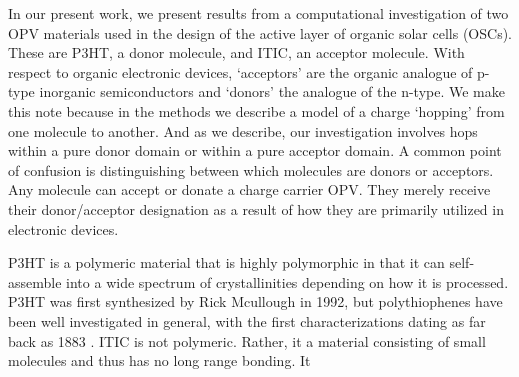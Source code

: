 In our present work, we present results from a computational investigation of two OPV materials
used in the design of the active layer of organic solar cells (OSCs). These are P3HT, a
donor molecule, and ITIC, an acceptor molecule. With respect to organic electronic devices, `acceptors' are the
organic analogue of p-type inorganic semiconductors and `donors' the analogue
of the n-type. We make this note because in the methods we describe a model of
a charge `hopping' from one molecule to another. And as we describe, our
investigation involves hops within a pure donor domain or within a pure
acceptor domain. A common point of confusion is distinguishing between which
molecules are donors or acceptors.
Any molecule can accept or donate a charge carrier OPV.
They merely receive their donor/acceptor designation as a result of how they
are primarily utilized in electronic devices. 

P3HT is a polymeric material that is highly polymorphic in that it can self-assemble into a wide spectrum of
crystallinities depending on how it is processed. 
P3HT was first synthesized by Rick Mcullough in 1992, but polythiophenes have been well investigated in
general, with the first characterizations dating as far back as 1883 \cite{Poelking2014}.
ITIC is not polymeric. Rather, it a material consisting of small molecules and thus has no long range bonding.
It

